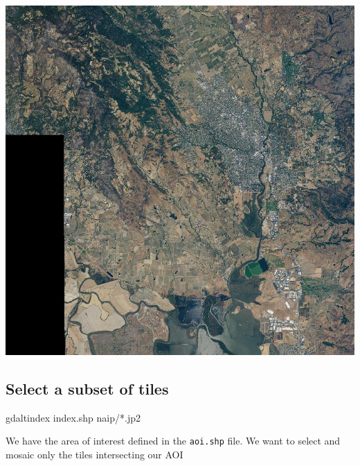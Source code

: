 \documentclass[12pt,a4paper]{article}
\newenvironment{Shaded}{\begin{snugshade}}{\end{snugshade}}
\newcommand{\ExtensionTok}[1]{#1}
\newcommand{\NormalTok}[1]{#1}
\begin{document}
\begin{Shaded}
\end{Shaded}

\begin{center}\includegraphics{images/gdal/naip_preview} \end{center}

\hypertarget{select-a-subset-of-tiles}{%
\subsection{Select a subset of tiles}\label{select-a-subset-of-tiles}}

\begin{Shaded}
\begin{Highlighting}[]
\ExtensionTok{gdaltindex}\NormalTok{ index.shp naip/*.jp2}
\end{Highlighting}
\end{Shaded}

We have the area of interest defined in the \texttt{aoi.shp} file. We
want to select and mosaic only the tiles intersecting our AOI
\end{document}
